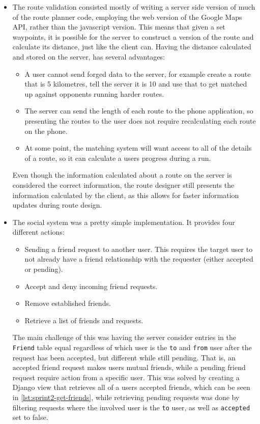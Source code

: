 \begin{itemize}
	\item{The route validation consisted mostly of writing a server side version of much of the route planner code, employing the web version of the Google Maps \ac{API}, rather than the javascript version. This means that given a set waypoints, it is possible for the server to construct a version of the route and calculate its distance, just like the client can. Having the distance calculated and stored on the server, has several advantages:}
	\begin{itemize}
		\item{A user cannot send forged data to the server, for example create a route that is 5 kilometres, tell the server it is 10 and use that to get matched up against opponents running harder routes.}
		\item{The server can send the length of each route to the phone application, so presenting the routes to the user does not require recalculating each route on the phone.}
		\item{At some point, the matching system will want access to all of the details of a route, so it can calculate a users progress during a run.}
	\end{itemize}
	Even though the information calculated about a route on the server is considered the correct information, the route designer still presents the information calculated by the client, as this allows for faster information updates during route design.
	\item{The social system was a pretty simple implementation. It provides four different actions:}
	\begin{itemize}
		\item{Sending a friend request to another user. This requires the target user to not already have a friend relationship with the requester (either accepted or pending).}
		\item{Accept and deny incoming friend requests.}
		\item{Remove established friends.}
		\item{Retrieve a list of friends and requests.}
	\end{itemize}
	The main challenge of this was having the server consider entries in the \texttt{Friend} table equal regardless of which user is the \texttt{to} and \texttt{from} user after the request has been accepted, but different while still pending. That is, an accepted friend request makes users mutual friends, while a pending friend request require action from a specific user. This was solved by creating a Django view that retrieves all of a users accepted friends, which can be seen in \autoref{lst:sprint2-get-friends}, while retrieving pending requests was done by filtering requests where the involved user is the \texttt{to} user, as well as \texttt{accepted} set to false.
\end{itemize}


